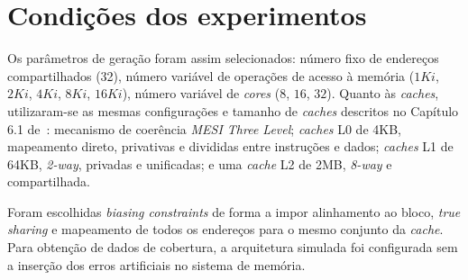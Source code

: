 \section{Condições dos experimentos}

Os parâmetros de geração foram assim selecionados: número fixo de endereços
compartilhados (32), número variável de operações de acesso à memória ($1Ki$,
$2Ki$, $4Ki$, $8Ki$, $16Ki$), número variável de \textit{cores} ($8$, $16$,
$32$).  Quanto às \textit{caches}, utilizaram-se as mesmas configurações e
tamanho de \textit{caches} descritos no Capítulo 6.1 de~\cite{Andrade:2017}:
mecanismo de coerência \textit{MESI Three Level}; \textit{caches} L0 de 4KB,
mapeamento direto, privativas e divididas entre instruções e dados;
\textit{caches} L1 de 64KB, \textit{2-way}, privadas e unificadas; e uma
\textit{cache} L2 de 2MB, \textit{8-way} e compartilhada.

Foram escolhidas \textit{biasing constraints} de forma a impor alinhamento ao
bloco, \textit{true sharing} e mapeamento de todos os endereços para o mesmo
conjunto da \textit{cache}. Para obtenção de dados de cobertura, a arquitetura
simulada foi configurada sem a inserção dos erros artificiais no sistema de
memória.
